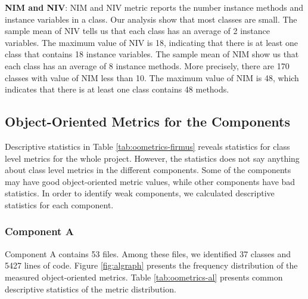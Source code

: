 \textbf{NIM and NIV}: NIM and NIV metric reports the number instance methods and instance variables in a class. Our analysis show that most classes are small. The sample mean of NIV tells us that each class has an average of 2 instance variables. The maximum value of NIV is 18, indicating that there is at least one class that contains 18 instance variables. The sample mean of NIM show us that each class has an average of 8 instance methods. More precisely, there are 170 classes with value of NIM less than 10. The maximum value of NIM is 48, which indicates that there is at least one class contains 48 methods. 





\subsection{Object-Oriented Metrics for the Components}
Descriptive statistics in Table \ref{tab:oometrics-firmus} reveals statistics for class level metrics for the whole project. However, the statistics does not say anything about class level metrics in the different components. Some of the components may have good object-oriented metric values, while other components have bad statistics. In order to identify weak components, we calculated descriptive statistics for each component. 

\subsubsection{Component A}
Component A contains 53 files. Among these files, we identified 37 classes and 5427 lines of code. Figure \ref{fig:algraph} presents the frequency distribution of the measured object-oriented metrics. Table \ref{tab:oometrics-al} presents common descriptive statistics of the metric distribution.

